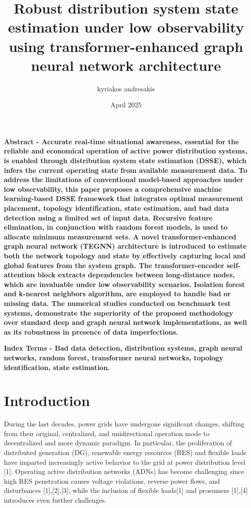 \documentclass[journal]{IEEEtran}  %
\title{Robust distribution system state estimation under low observability using transformer-enhanced graph neural network architecture}
\author{kyriakos andresakis}
\date{April 2025}
\begin{document}
\maketitle

\textbf{Abstract - Accurate real-time situational awareness, essential for the reliable and economical operation of active power distribution systems, is enabled through distribution system state estimation (DSSE), which infers the current operating state from available measurement data. To address the limitations of conventional model-based approaches under low observability, this paper proposes a comprehensive machine learning-based DSSE framework that integrates optimal measurement placement, topology identification, state estimation, and bad data detection using a limited set of input data. Recursive feature elimination, in conjunction with random forest models, is used to allocate minimum measurement sets. A novel transformer-enhanced graph neural network (TEGNN) architecture is introduced to estimate both the network topology and state by effectively capturing local and global features from the system graph. The transformer-encoder self-attention block extracts dependencies between long-distance nodes, which are invaluable under low observability scenarios. Isolation forest and k-nearest neighbors algorithm, are employed to handle bad or missing data. The numerical studies conducted on benchmark test systems, demonstrate the superiority of the proposed methodology over standard deep and graph neural network implementations, as well as its robustness in presence of data imperfections.}

\textbf{}

\textbf{Index Terms - Bad data detection, distribution systems, graph neural networks, random forest, transformer neural networks, topology identification, state estimation.}

\section{Introduction}

During the last decades, power grids have undergone significant changes, shifting from their original, centralized, and unidirectional operation mode to decentralized and more dynamic paradigm. In particular, the proliferation of distributed generation (DG), renewable energy resources (RES) and flexible loads have imparted increasingly active behavior to the grid at power distribution level [1]. Operating active distribution networks (ADNs) has become challenging since high RES penetration causes voltage violations, reverse power flows, and disturbances [1],[2],[3], while the inclusion of flexible loads[1] and prosumers [1],[4] introduces even further challenges.
\end{document}
